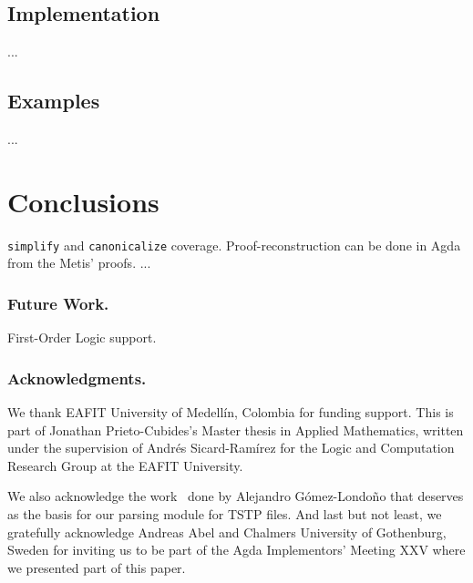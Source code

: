\documentclass[runningheads,a4paper]{llncs}
\begin{document}
%



\subsection{Implementation}
...
\subsection{Examples}
...


\section{Conclusions}
\label{secconclusion}
\verb!simplify! and \verb!canonicalize! coverage.
Proof-reconstruction can be done in Agda from the Metis' proofs.
...

\subsubsection*{Future Work.}
First-Order Logic support.

\subsubsection*{Acknowledgments.}
We thank EAFIT University of Medell\'in, Colombia for funding support.
This is part of Jonathan Prieto-Cubides's Master thesis in Applied
Mathematics, written under the supervision of Andr\'es Sicard-Ram\'irez
for the Logic and Computation Research Group at the EAFIT University.

We also acknowledge the work~\cite{Gomez-Londono2015} done by
Alejandro G\'omez-Londo\~no that deserves as the basis for our parsing module
for TSTP files. And last but not least, we gratefully acknowledge Andreas Abel and Chalmers University of Gothenburg, Sweden for inviting us to be part of the Agda Implementors’ Meeting XXV where we presented part of this paper.



\end{document}
